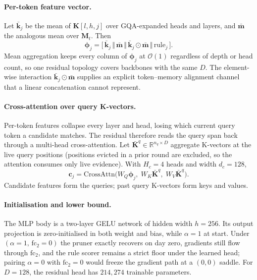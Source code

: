 \documentclass[11pt]{article}
\begin{document}
\paragraph{Per-token feature vector.}
Let $\bar{\mathbf{k}}_j$ be the mean of $\mathbf{K}[l,h,j]$ over
GQA-expanded heads and layers, and $\bar{\mathbf{m}}$ the analogous
mean over $\mathbf{M}_t$. Then
\begin{equation}
\bm{\phi}_j=
\big[\,\bar{\mathbf{k}}_j\,\Vert\,\bar{\mathbf{m}}\,\Vert\,
\bar{\mathbf{k}}_j\!\odot\!\bar{\mathbf{m}}\,\Vert\,\mathrm{rule}_j\,\big].
\end{equation}
Mean aggregation keeps every column of $\bm{\phi}_j$ at
$\mathcal{O}(1)$ regardless of depth or head count, so one residual
topology covers backbones with the same $D$. The element-wise
interaction $\bar{\mathbf{k}}_j\!\odot\!\bar{\mathbf{m}}$ supplies
an explicit token--memory alignment channel that a linear
concatenation cannot represent.

\paragraph{Cross-attention over query K-vectors.}
Per-token features collapse every layer and head, losing which
current query token a candidate matches. The residual therefore
reads the query span back through a multi-head cross-attention. Let
$\bar{\mathbf{K}}^{q}\!\in\!\mathbb{R}^{n_q\times D}$ aggregate
K-vectors at the live query positions (positions evicted in a prior
round are excluded, so the attention consumes only live evidence). With $H_c\!=\!4$ heads and width
$d_c\!=\!128$,
\begin{equation}
\mathbf{c}_j=\mathrm{CrossAttn}\big(W_Q\bm{\phi}_j,\;
W_K\bar{\mathbf{K}}^{q},\;W_V\bar{\mathbf{K}}^{q}\big).
\label{eq:xattn}
\end{equation}
Candidate features form the queries; past query K-vectors form
keys and values.

\paragraph{Initialisation and lower bound.}
The MLP body is a two-layer GELU network of hidden width
$h\!=\!256$. Its output projection is zero-initialised in both
weight and bias, while $\alpha\!=\!1$ at start. Under
$(\alpha\!=\!1,\,\mathrm{fc}_2\!=\!0)$ the pruner exactly recovers
 on day zero, gradients still flow through
$\mathrm{fc}_2$, and the rule scorer remains a strict floor under
the learned head; pairing $\alpha\!=\!0$ with $\mathrm{fc}_2\!=\!0$
would freeze the gradient path at a $(0,0)$ saddle. For
$D\!=\!128$, the residual head has $214{,}274$ trainable
parameters.
\end{document}
